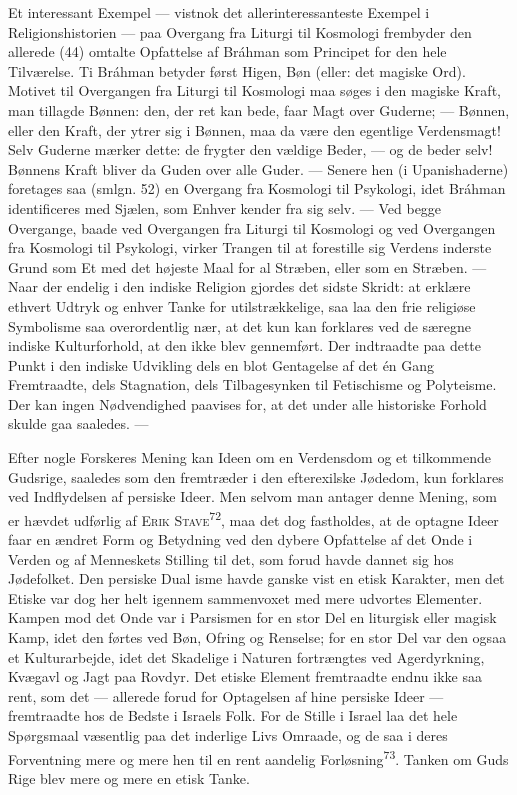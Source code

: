 \documentclass[12pt,a4paper,openany]{book}
\newcommand{\opage}[1]{\marginnote{\footnotesize\textit{[#1]}}}
\begin{document}
Et interessant Exempel --- vistnok det allerinteressanteste Exempel i
Religionshistorien --- paa Overgang fra Liturgi til Kosmologi frembyder
den allerede (44) omtalte Opfattelse af Bráhman som Principet for den
hele Tilværelse. Ti Bráhman betyder først Higen, Bøn (eller: det magiske
Ord). Motivet til Overgangen fra Liturgi til Kosmologi maa søges i den
magiske Kraft, man tillagde Bønnen: den, der ret kan bede, faar Magt
over Guderne; --- Bønnen, eller den Kraft, der ytrer sig i Bønnen, maa
da være den egentlige Verdensmagt! Selv Guderne mærker dette: de frygter
den vældige Beder, --- og de beder selv! Bønnens Kraft bliver da Guden
over alle Guder. --- Senere hen (i Upanishaderne) foretages saa (smlgn.
52) en Overgang fra Kosmologi til Psykologi, idet Bráhman identificeres
med Sjælen, som Enhver kender fra sig selv. --- Ved begge Overgange,
baade ved Overgangen fra Liturgi til Kosmologi og ved Overgangen fra
Kosmologi til Psykologi, virker Trangen til at forestille sig Verdens
inderste Grund som Et med det højeste Maal for al Stræben, eller som en
Stræben. --- Naar der endelig i den indiske Religion gjordes det sidste
Skridt: at erklære ethvert Udtryk og enhver Tanke for utilstrækkelige,
saa laa den frie religiøse Symbolisme saa overordentlig nær, at det kun
kan forklares ved de særegne indiske Kulturforhold, at den ikke blev
gennemført. Der indtraadte paa dette Punkt i den indiske Udvikling dels
en blot Gentagelse af det én Gang Fremtraadte, dels Stagnation, dels
Tilbagesynken til Fetischisme og Polyteisme. Der kan ingen Nødvendighed
paavises for, at det under alle historiske Forhold skulde gaa saaledes.
---

Efter nogle Forskeres Mening kan Ideen om en Verdensdom og et
tilkommende Gudsrige, saaledes som den fremtræder i den efterexilske
Jødedom, kun forklares ved Indflydelsen af persiske Ideer. Men selvom
man antager denne Mening, som er hævdet udførlig af \textsc{Erik
Stave}\textsuperscript{72}, maa det dog fastholdes, at de optagne Ideer
faar en ændret Form og Betydning ved den dybere Opfattelse af det Onde i
Verden og af Menneskets Stilling til det, som forud havde dannet sig hos
Jødefolket. Den persiske Dual%
\opage{143}isme havde ganske vist en etisk Karakter, men det Etiske var
dog her helt igennem sammenvoxet med mere udvortes Elementer. Kampen mod
det Onde var i Parsismen for en stor Del en liturgisk eller magisk Kamp,
idet den førtes ved Bøn, Ofring og Renselse; for en stor Del var den
ogsaa et Kulturarbejde, idet det Skadelige i Naturen fortrængtes ved
Agerdyrkning, Kvægavl og Jagt paa Rovdyr. Det etiske Element fremtraadte
endnu ikke saa rent, som det --- allerede forud for Optagelsen af hine
persiske Ideer --- fremtraadte hos de Bedste i Israels Folk. For de
Stille i Israel laa det hele Spørgsmaal væsentlig paa det inderlige Livs
Omraade, og de saa i deres Forventning mere og mere hen til en rent
aandelig Forløsning\textsuperscript{73}. Tanken om Guds Rige blev mere
og mere en etisk Tanke.
\end{document}
